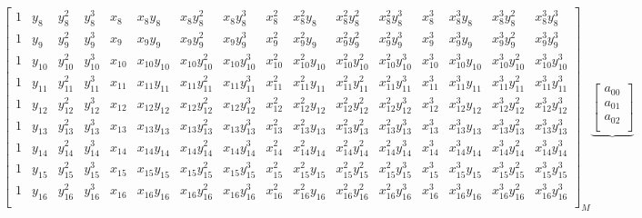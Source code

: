 \documentclass[a4paper, landscape]{article}
\begin{document}
\begin{equation}
{\begin{bmatrix}
        1 & y_8 & y_8^2 & y_8^3 & x_8 & x_8y_8 & x_8y_8^2 & x_8y_8^3 & x_8^2 & x_8^2y_8 & x_8^2y_8^2 & x_8^2y_8^3 & x_8^3 & x_8^3y_8 & x_8^3y_8^2 & x_8^3y_8^3\\
        1 & y_9 & y_9^2 & y_9^3 & x_9 & x_9y_9 & x_9y_9^2 & x_9y_9^3 & x_9^2 & x_9^2y_9 & x_9^2y_9^2 & x_9^2y_9^3 & x_9^3 & x_9^3y_9 & x_9^3y_9^2 & x_9^3y_9^3\\
        1 & y_{10} & y_{10}^2 & y_{10}^3 & x_{10} & x_{10}y_{10} & x_{10}y_{10}^2 & x_{10}y_{10}^3 & x_{10}^2 & x_{10}^2y_{10} & x_{10}^2y_{10}^2 & x_{10}^2y_{10}^3 & x_{10}^3 & x_{10}^3y_{10} & x_{10}^3y_{10}^2 & x_{10}^3y_{10}^3\\
        1 & y_{11} & y_{11}^2 & y_{11}^3 & x_{11} & x_{11}y_{11} & x_{11}y_{11}^2 & x_{11}y_{11}^3 & x_{11}^2 & x_{11}^2y_{11} & x_{11}^2y_{11}^2 & x_{11}^2y_{11}^3 & x_{11}^3 & x_{11}^3y_{11} & x_{11}^3y_{11}^2 & x_{11}^3y_{11}^3\\
        1 & y_{12} & y_{12}^2 & y_{12}^3 & x_{12} & x_{12}y_{12} & x_{12}y_{12}^2 & x_{12}y_{12}^3 & x_{12}^2 & x_{12}^2y_{12} & x_{12}^2y_{12}^2 & x_{12}^2y_{12}^3 & x_{12}^3 & x_{12}^3y_{12} & x_{12}^3y_{12}^2 & x_{12}^3y_{12}^3\\
        1 & y_{13} & y_{13}^2 & y_{13}^3 & x_{13} & x_{13}y_{13} & x_{13}y_{13}^2 & x_{13}y_{13}^3 & x_{13}^2 & x_{13}^2y_{13} & x_{13}^2y_{13}^2 & x_{13}^2y_{13}^3 & x_{13}^3 & x_{13}^3y_{13} & x_{13}^3y_{13}^2 & x_{13}^3y_{13}^3\\
        1 & y_{14} & y_{14}^2 & y_{14}^3 & x_{14} & x_{14}y_{14} & x_{14}y_{14}^2 & x_{14}y_{14}^3 & x_{14}^2 & x_{14}^2y_{14} & x_{14}^2y_{14}^2 & x_{14}^2y_{14}^3 & x_{14}^3 & x_{14}^3y_{14} & x_{14}^3y_{14}^2 & x_{14}^3y_{14}^3\\
        1 & y_{15} & y_{15}^2 & y_{15}^3 & x_{15} & x_{15}y_{15} & x_{15}y_{15}^2 & x_{15}y_{15}^3 & x_{15}^2 & x_{15}^2y_{15} & x_{15}^2y_{15}^2 & x_{15}^2y_{15}^3 & x_{15}^3 & x_{15}^3y_{15} & x_{15}^3y_{15}^2 & x_{15}^3y_{15}^3\\
        1 & y_{16} & y_{16}^2 & y_{16}^3 & x_{16} & x_{16}y_{16} & x_{16}y_{16}^2 & x_{16}y_{16}^3 & x_{16}^2 & x_{16}^2y_{16} & x_{16}^2y_{16}^2 & x_{16}^2y_{16}^3 & x_{16}^3 & x_{16}^3y_{16} & x_{16}^3y_{16}^2 & x_{16}^3y_{16}^3\\
    \end{bmatrix}
    }_{M}
    \underbrace{
    \begin{bmatrix}
    a_{00}\\
    a_{01}\\
    a_{02}\\

\end{bmatrix}}
\end{equation}
\end{document}
